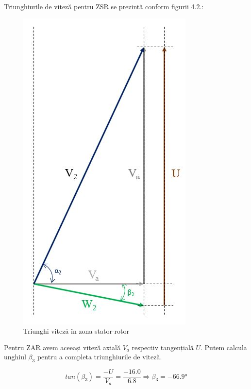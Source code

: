 Triunghiurile de viteză pentru ZSR se prezintă conform figurii 4.2.:

\begin{figure}[h!]
	\centering
	\includegraphics[scale=0.55]{figures/triunghi_viteza_ZSR.jpg}
	\caption{Triunghi viteză în zona stator-rotor}
	\label{Triunghi viteză în zona stator-rotor}
\end{figure}


Pentru ZAR avem aceeași viteză axială $V_a$ respectiv tangențială $U$. Putem calcula unghiul $\beta_3$ pentru a completa triunghiurile de viteză.

\begin{equation}
tan(\beta_{3})=\frac{-U}{V_a} = \frac{-16.0}{6.8} \Rightarrow \beta_{3} = -66.9\si{\degree}
\end{equation}

